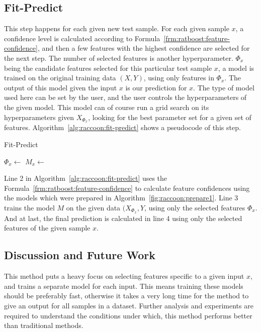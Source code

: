 \subsection{Fit-Predict}
This step happens for each given new test sample. For each given sample $x$, a confidence level is calculated according to Formula~\ref{frm:ratboost:feature-confidence}, and then a few features with the highest confidence are selected for the next step. The number of selected features is another hyperparameter. $\Phi_x$ being the candidate features selected for this particular test sample $x$, a model is trained on the original training data $(X, Y)$, using only features in $\Phi_x$. The output of this model given the input $x$ is our prediction for $x$. The type of model used here can be set by the user, and the user controls the hyperparameters of the given model. This model can of course run a grid search on its hyperparameters given $X_{\Phi_x}$, looking for the best parameter set for a given set of features. Algorithm~\ref{alg:raccoon:fit-predict} shows a pseudocode of this step.


\begin{algorithm}
\caption{Fit-Predict}
\label{alg:raccoon:fit-predict}
\begin{algorithmic}[1]
    \State $\Phi_x \gets $ 
    \State $M_x \gets $ 
    \State \Return {}
\EndFunction
\end{algorithmic}
\end{algorithm}

Line 2 in Algorithm~\ref{alg:raccoon:fit-predict} uses the Formula~\ref{frm:ratboost:feature-confidence} to calculate feature confidences using the models which were prepared in Algorithm~\ref{fig:raccoon:prepare1}. Line 3 trains the model $M$ on the given data $(X_{\Phi_x}, Y$, using only the selected features $\Phi_x$. And at last, the final prediction is calculated in line 4 using only the selected features of the given sample $x$.

\subsection{Discussion and Future Work}
This method puts a heavy focus on selecting features specific to a given input $x$, and trains a separate model for each input. This means training these models should be preferably fast, otherwise it takes a very long time for the method to give an output for all samples in a dataset. Further analysis and experiments are required to understand the conditions under which, this method performs better than traditional methods.

